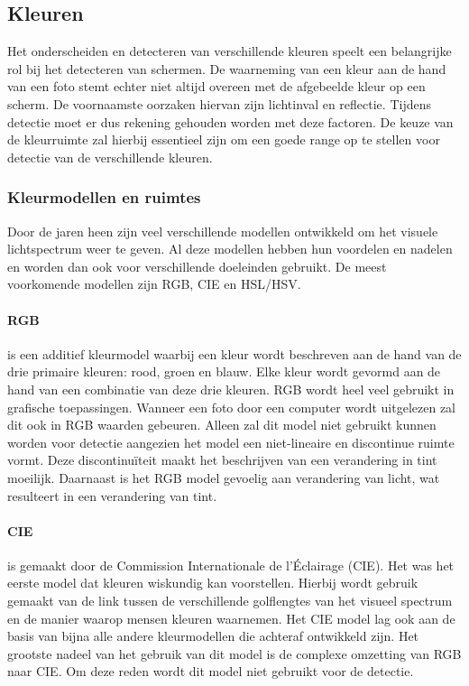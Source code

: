 
\subsection{Kleuren} \label{Kleuren}
Het onderscheiden en detecteren van verschillende kleuren speelt een belangrijke rol bij het detecteren van schermen. De waarneming van een kleur aan de hand van een foto stemt echter niet altijd overeen met de afgebeelde kleur op een scherm. De voornaamste oorzaken hiervan zijn lichtinval en reflectie. Tijdens detectie moet er dus rekening gehouden worden met deze factoren. De keuze van de kleurruimte zal hierbij essentieel zijn om een goede range op te stellen voor detectie van de verschillende kleuren.

\subsubsection{Kleurmodellen en ruimtes}
Door de jaren heen zijn veel verschillende modellen ontwikkeld om het visuele lichtspectrum weer te geven. Al deze modellen hebben hun voordelen en nadelen en worden dan ook voor verschillende doeleinden gebruikt. De meest voorkomende modellen zijn RGB, CIE en HSL/HSV. 
\paragraph{RGB} is een additief kleurmodel waarbij een kleur wordt beschreven aan de hand van de drie primaire kleuren: rood, groen en blauw. Elke kleur wordt gevormd aan de hand van een combinatie van deze drie kleuren. RGB wordt heel veel gebruikt in grafische toepassingen. Wanneer een foto door een computer wordt uitgelezen zal dit ook in RGB waarden gebeuren. Alleen zal dit model niet gebruikt kunnen worden voor detectie aangezien het model een niet-lineaire en discontinue ruimte vormt. Deze discontinuïteit maakt het beschrijven van een verandering in tint moeilijk. Daarnaast is het RGB model gevoelig aan verandering van licht, wat resulteert in een verandering van tint. 
\paragraph{CIE} is gemaakt door de Commission Internationale de l'Éclairage (CIE). Het was het eerste model dat kleuren wiskundig kan voorstellen. Hierbij wordt gebruik gemaakt van de link tussen de verschillende golflengtes van het visueel spectrum en de manier waarop mensen kleuren waarnemen. Het CIE model lag ook aan de basis van bijna alle andere kleurmodellen die achteraf ontwikkeld zijn. Het grootste nadeel van het gebruik van dit model is de complexe omzetting van RGB naar CIE. Om deze reden wordt dit model niet gebruikt voor de detectie.  
